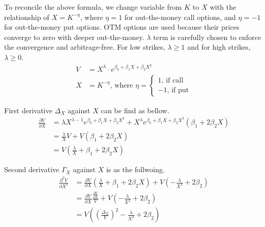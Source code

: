 \documentclass{article}
\begin{document}
To reconcile the above formula, we change variable from $ K $ to $ X $ with the relationship of $ X = K^{-\eta} $, where $ \eta = 1 $ for out-the-money call options, and $ \eta = -1 $ for out-the-money put options.
OTM options are used because their prices converge to zero with deeper out-the-money.
$ \lambda $ term is carefully chosen to enforce the convergence and arbitrage-free.
For low strikes, $ \lambda \geq 1 $ and for high strikes, $ \lambda \geq 0 $.
\begin{subequations}
    \begin{align}
        V &= X^{\lambda} \cdot e^{\beta_0 + \beta_1 X + \beta_2 X^2} \\
        X &= K^{-\eta} \text{, where } \eta =
        \begin{cases}
            1 \text{, if call} \\
            -1 \text{, if put}
        \end{cases}
    \end{align}
\end{subequations}

First derivative $ \Delta_X $ against $ X $ can be find as bellow.
\begin{align}
    \frac{\partial V}{\partial X} &= \lambda X^{\lambda - 1} e^{\beta_0 + \beta_1 X + \beta_2 X^2} + X^{\lambda} e^{\beta_0 + \beta_1 X + \beta_2 X^2} \left(\beta_1 + 2 \beta_2 X \right) \nonumber \\
    &= \frac{\lambda}{X} V + V \left(\beta_1 + 2 \beta_2 X\right) \nonumber \\
    &= V \left(\frac{\lambda}{X} + \beta_1 + 2 \beta_2 X\right)
\end{align}

Second derivative $ \Gamma_X $ against $ X $ is as the follwoing.
\begin{align}
    \frac{\partial^2 V}{\partial X^2} &= \frac{\partial V}{\partial X} \left(\frac{\lambda}{X} + \beta_1 + 2 \beta_2 X\right) + V \left(-\frac{\lambda}{X^2} + 2 \beta_2\right) \nonumber \\
    &= \frac{\partial V}{\partial X} \frac{\frac{\partial V}{\partial X}}{V} + V \left(-\frac{\lambda}{X^2} + 2 \beta_2\right) \nonumber \\
    &= V \left(\left(\frac{\Delta_X}{V}\right)^2 -\frac{\lambda}{X^2} + 2 \beta_2 \right)
\end{align}
\end{document}
